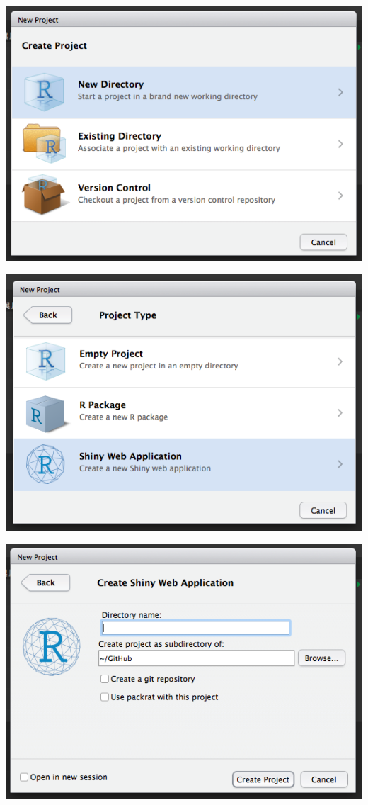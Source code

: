 \documentclass[]{book}
\theoremstyle{definition}
\theoremstyle{definition}
\theoremstyle{remark}
\begin{document}
\includegraphics[width=7.68in]{figure/shiny2}

\includegraphics[width=7.74in]{figure/shiny3}

\includegraphics[width=7.68in]{figure/shiny4}
\end{document}
